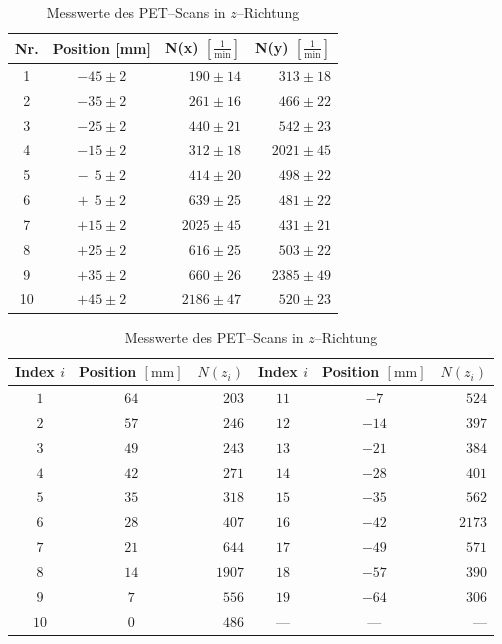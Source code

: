 \documentclass[12pt,a4paper]{scrartcl}
\numberwithin{equation}{section} %
\begin{document}
\begin{table}
	\centering
	\begin{tabular}[h]{c|c|r|r}
		Nr. & Position [mm] & N(x) $[\frac{1}{\mathrm{min}}]$ & N(y) $[\frac{1}{\mathrm{min}}]$ \\
		\hline
		1 & $-45 \pm 2$ & $190 \pm 14$ & $313 \pm 18$ \\
		2 & $-35 \pm 2$ & $261 \pm 16$ & $466 \pm 22$ \\
		3 & $-25 \pm 2$ & $440 \pm 21$ & $542 \pm 23$ \\
		4 & $-15 \pm 2$ & $312 \pm 18$ & $2021 \pm 45$ \\
		5 & $-\ \ 5 \pm 2$ & $414 \pm 20$ & $498 \pm 22$ \\
		6 & $+\ \ 5 \pm 2$ & $639 \pm 25$ & $481 \pm 22$ \\
		7 & $+15 \pm 2$ & $2025 \pm 45$ & $431 \pm 21$ \\
		8 & $+25 \pm 2$ & $616 \pm 25$ & $503 \pm 22$ \\
		9 & $+35 \pm 2$ & $660 \pm 26$ & $2385 \pm 49$ \\
		10 & $+45 \pm 2$ & $2186 \pm 47$ & $520 \pm 23$
	\end{tabular}
	\caption{Messwerte des PET--Scans in $x$-- und $y$--Richtung}
	\label{tab:PET x y}
	
	\vspace{24pt}
	\begin{tabular}{c|c|r||c|c|r}
		Index $i$ &
		Position $[\mathrm{mm}]$ &
		$N(z_i)$ &
		Index $i$ &
		Position $[\mathrm{mm}]$ &
		$N(z_i)$ \\
		\hline
		$1$ & $64$ & $203$ &
		$11$ & $-7$ & $524$ \\
		$2$ & $57$ & $246$ &
		$12$ & $-14$ & $397$ \\
		$3$ & $49$ & $243$ &
		$13$ & $-21$ & $384$ \\
		$4$ & $42$ & $271$ &
		$14$ & $-28$ & $401$ \\
		$5$ & $35$ & $318$ &
		$15$ & $-35$ & $562$ \\
		$6$ & $28$ & $407$ &
		$16$ & $-42$ & $2173$ \\
		$7$ & $21$ & $644$ &
		$17$ & $-49$ & $571$ \\
		$8$ & $14$ & $1907$ &
		$18$ & $-57$ & $390$ \\
		$9$ & $7$ & $556$ &
		$19$ & $-64$ & $306$ \\
		$10$ & $0$ & $486$ &---&---&---
	\end{tabular}
	\caption{Messwerte des PET--Scans in $z$--Richtung}
	\label{tab:PET z}


\end{table}
\end{document}
